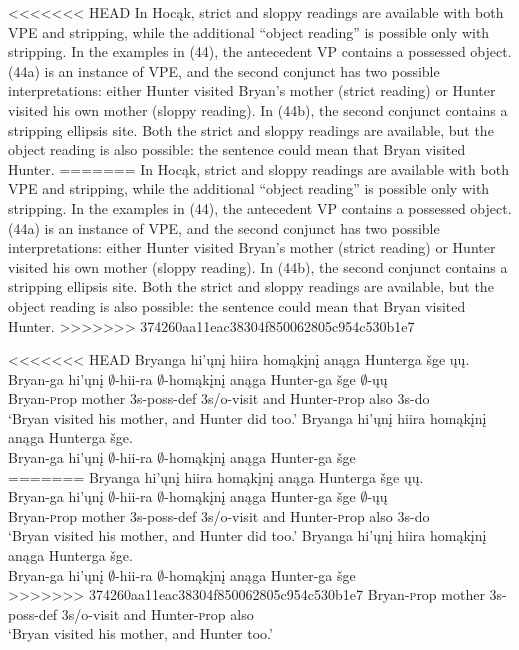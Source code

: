 \documentclass[output=paper]{LSP/langsci}
\begin{document}
<<<<<<< HEAD
In Hocąk, strict and sloppy readings are available with both VPE and stripping, while the additional ``object reading'' is possible only with stripping. In the examples in (44), the antecedent VP contains a possessed object. (44a) is an instance of VPE, and the second conjunct has two possible interpretations: either Hunter visited Bryan's mother (strict reading) or Hunter visited his own mother (sloppy reading). In (44b), the second conjunct contains a stripping ellipsis site. Both the strict and sloppy readings are available, but the object reading is also possible: the sentence could mean that Bryan visited Hunter.
=======
In Hoc\k{a}k, strict and sloppy readings are available with both VPE and stripping, while the additional ``object reading'' is possible only with stripping. In the examples in (44), the antecedent VP contains a possessed object. (44a) is an instance of VPE, and the second conjunct has two possible interpretations: either Hunter visited Bryan's mother (strict reading) or Hunter visited his own mother (sloppy reading). In (44b), the second conjunct contains a stripping ellipsis site. Both the strict and sloppy readings are available, but the object reading is also possible: the sentence could mean that Bryan visited Hunter.
>>>>>>> 374260aa11eac38304f850062805c954c530b1e7

\begin{exe}
\ex
\begin{xlist}
\ex
<<<<<<< HEAD
\glll Bryanga hi'ųnį hiira homąkįnį anąga Hunterga šge ųų.\\
Bryan-ga hi'ųnį $\emptyset$-hii-ra $\emptyset$-homąkįnį anąga Hunter-ga šge $\emptyset$-ųų\\
Bryan-{\textsc prop} mother {\textsc 3s-poss-def} {\textsc 3s/o}-visit and Hunter-{\textsc prop} also {\textsc 3s}-do\\
\trans `Bryan visited his mother, and Hunter did too.'
\ex
\glll Bryanga hi'ųnį hiira homąkįnį anąga Hunterga šge.\\
Bryan-ga hi'ųnį $\emptyset$-hii-ra $\emptyset$-homąkįnį anąga Hunter-ga šge\\
=======
\glll Bryanga hi'\k{u}n\k{i} hiira hom\k{a}k\k{i}n\k{i} an\k{a}ga Hunterga \v{s}ge \k{u}\k{u}.\\
Bryan-ga hi'\k{u}n\k{i} $\emptyset$-hii-ra $\emptyset$-hom\k{a}k\k{i}n\k{i} an\k{a}ga Hunter-ga \v{s}ge $\emptyset$-\k{u}\k{u}\\
Bryan-{\textsc prop} mother {\textsc 3s-poss-def} {\textsc 3s/o}-visit and Hunter-{\textsc prop} also {\textsc 3s}-do\\
\trans `Bryan visited his mother, and Hunter did too.'
\ex
\glll Bryanga hi'\k{u}n\k{i} hiira hom\k{a}k\k{i}n\k{i} an\k{a}ga Hunterga \v{s}ge.\\
Bryan-ga hi'\k{u}n\k{i} $\emptyset$-hii-ra $\emptyset$-hom\k{a}k\k{i}n\k{i} an\k{a}ga Hunter-ga \v{s}ge\\
>>>>>>> 374260aa11eac38304f850062805c954c530b1e7
Bryan-{\textsc prop} mother {\textsc 3s-poss-def} {\textsc 3s/o}-visit and Hunter-{\textsc prop} also\\
\trans `Bryan visited his mother, and Hunter too.'
\end{xlist}
\end{exe}
\end{document}
